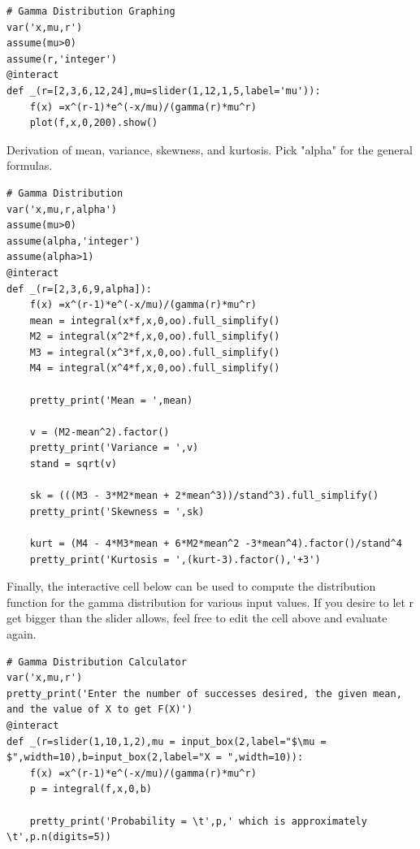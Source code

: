 \documentclass[10pt,]{book}
\theoremstyle{plain}
\theoremstyle{definition}
\theoremstyle{definition}
\theoremstyle{definition}
\numberwithin{equation}{section}
\begin{document}
\begin{lstlisting}[style=sageinput]
# Gamma Distribution Graphing
var('x,mu,r')
assume(mu>0)
assume(r,'integer')
@interact
def _(r=[2,3,6,12,24],mu=slider(1,12,1,5,label='mu')):
    f(x) =x^(r-1)*e^(-x/mu)/(gamma(r)*mu^r)
    plot(f,x,0,200).show()
\end{lstlisting}

%
\par

Derivation of mean, variance, skewness, and kurtosis. Pick "alpha" for the general formulas.
\begin{lstlisting}[style=sageinput]
# Gamma Distribution
var('x,mu,r,alpha')
assume(mu>0)
assume(alpha,'integer')
assume(alpha>1)
@interact
def _(r=[2,3,6,9,alpha]):
    f(x) =x^(r-1)*e^(-x/mu)/(gamma(r)*mu^r)
    mean = integral(x*f,x,0,oo).full_simplify()
    M2 = integral(x^2*f,x,0,oo).full_simplify()
    M3 = integral(x^3*f,x,0,oo).full_simplify()
    M4 = integral(x^4*f,x,0,oo).full_simplify()
    
    pretty_print('Mean = ',mean)
    
    v = (M2-mean^2).factor()
    pretty_print('Variance = ',v)
    stand = sqrt(v)
    
    sk = (((M3 - 3*M2*mean + 2*mean^3))/stand^3).full_simplify()
    pretty_print('Skewness = ',sk)
    
    kurt = (M4 - 4*M3*mean + 6*M2*mean^2 -3*mean^4).factor()/stand^4
    pretty_print('Kurtosis = ',(kurt-3).factor(),'+3')
\end{lstlisting}

%
\par
Finally, the interactive cell below can be used to compute the distribution function for the gamma distribution for various input values. If you desire to let r get bigger than the slider allows, feel free to edit the cell above and evaluate again.

\begin{lstlisting}[style=sageinput]
# Gamma Distribution Calculator
var('x,mu,r')
pretty_print('Enter the number of successes desired, the given mean, and the value of X to get F(X)')
@interact
def _(r=slider(1,10,1,2),mu = input_box(2,label="$\mu = $",width=10),b=input_box(2,label="X = ",width=10)):
    f(x) =x^(r-1)*e^(-x/mu)/(gamma(r)*mu^r)
    p = integral(f,x,0,b)
    
    pretty_print('Probability = \t',p,' which is approximately \t',p.n(digits=5))
\end{lstlisting}
\end{document}
